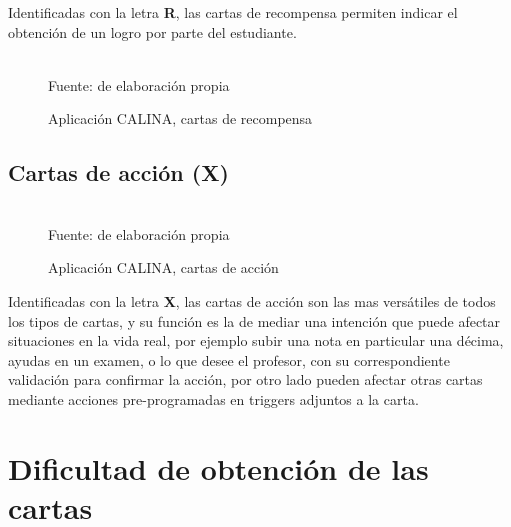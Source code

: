 Identificadas con la letra \textbf{R}, las cartas de recompensa permiten indicar el obtención de un logro por 
parte del estudiante.

\begin{figure}[!htb]
\caption[]{Aplicación CALINA, cartas de recompensa}
\centering
{}
\hspace{2cm}
\\
{\footnotesize Fuente: de elaboración propia}
\end{figure}

\subsection{Cartas de acción (X)}

\begin{figure}[!htb]
\caption[]{Aplicación CALINA, cartas de acción}
\centering
{}
\hspace{2cm}
\\
{\footnotesize Fuente: de elaboración propia}
\end{figure}

Identificadas con la letra \textbf{X}, las cartas de acción son las mas versátiles de todos los tipos de 
cartas, y su función es la de mediar una intención que puede afectar situaciones en la vida real, por ejemplo 
subir una nota en particular una décima, ayudas en un examen, o lo que desee el profesor, con su 
correspondiente validación para confirmar la acción, por otro lado pueden afectar otras cartas mediante 
acciones pre-programadas en triggers adjuntos a la carta.

\section{Dificultad de obtención de las cartas}
\label{sec:app_dificultad}

